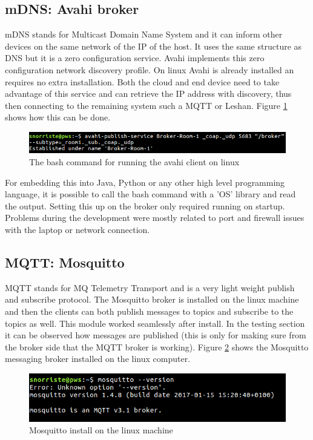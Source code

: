 \documentclass[11pt]{article}
\begin{document}


\subsection{mDNS: Avahi broker}
mDNS stands for Multicast Domain Name System and it can inform other devices on the same network of the IP of the host. It uses the same structure as DNS but it is a zero configuration service. Avahi implements this zero configuration network discovery profile. On linux Avahi is already installed an requires no extra installation. Both the cloud and end device need to take advantage of this service and can retrieve the IP address with discovery, thus then connecting to the remaining system such a MQTT or Leshan. Figure \ref{fig:avahi} shows how this can be done.

\begin{figure}[h]
	\begin{center}
		\includegraphics[width=1.1\linewidth]{img/avahi}
		\caption{The bash command for running the avahi client on linux}
		\label{fig:avahi}
	\end{center}
\end{figure}


For embedding this into Java, Python or any other high level programming language, it is possible to call the bash command with a 'OS' library and read the output. Setting this up on the broker only required running on startup. Problems during the development were mostly related to port and firewall issues with the laptop or network connection.

\subsection{MQTT: Mosquitto}
MQTT stands for MQ Telemetry Transport and is a very light weight publish and subscribe protocol. The Mosquitto broker is installed on the linux machine and then the clients can both publish messages to topics and subscribe to the topics as well. This module worked seamlessly after install. In the testing section it can be observed how messages are published (this is only for making sure from the broker side that the MQTT broker is working). Figure \ref{fig:mqtt2} shows the Mosquitto messaging broker installed on the linux computer.

\begin{figure}[h]
	\begin{center}
		\includegraphics[width=.8\linewidth]{img/mqtt2}
		\caption{Mosquitto install on the linux machine}
		\label{fig:mqtt2}
	\end{center}
\end{figure}
\end{document}

